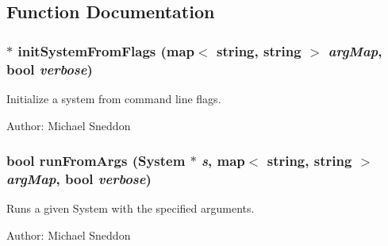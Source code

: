 \subsection{Function Documentation}
\subsubsection{$\ast$ initSystemFromFlags (map$<$ string, string $>$ {\em argMap}, bool {\em verbose})}\label{NFsim_8hh_6ea5809199618b1c969e667e5fa93d0e}


Initialize a system from command line flags. 

\begin{Desc}
\item[Author:]Michael Sneddon \end{Desc}
\subsubsection{\setlength{\rightskip}{0pt plus 5cm}bool runFromArgs ({\bf System} $\ast$ {\em s}, map$<$ string, string $>$ {\em argMap}, bool {\em verbose})}\label{NFsim_8hh_1df3932ce2db1db1f6c546529a162aa2}


Runs a given System with the specified arguments. 

\begin{Desc}
\item[Author:]Michael Sneddon \end{Desc}
